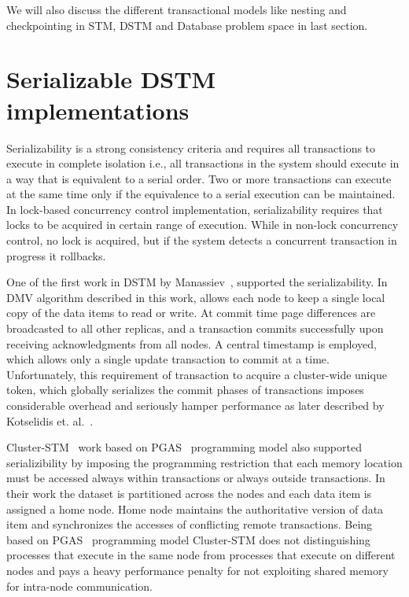 \documentclass[12pt,english]{report}
\begin{document}
We will also discuss the different transactional models like nesting and checkpointing in STM, DSTM and Database problem space in last section. 

\section{Serializable DSTM implementations}

Serializability is a strong consistency criteria and requires all transactions to execute in  complete isolation i.e., all transactions in the system should execute in a way that is equivalent to a serial order. Two or more transactions can execute at the same time only if the equivalence to a serial execution can be maintained. In lock-based concurrency control
implementation, serializability requires that locks to be acquired in certain range of
execution. While in non-lock concurrency control, no lock is acquired, but if the system detects a concurrent transaction in progress it rollbacks.

One of the first work in DSTM by Manassiev~\cite{Manassiev:2006:EDV:1122971.1123002}, supported the serializability. In DMV algorithm described in this work, allows each node to keep a single local copy of the data items to read or write. At commit time page differences are broadcasted to all other replicas, and a transaction commits successfully upon receiving acknowledgments from all nodes. A central timestamp is employed, which allows only a single update transaction to commit at a time. Unfortunately, this requirement of transaction to acquire a cluster-wide unique token, which globally serializes the commit phases of transactions imposes considerable overhead and seriously hamper performance as later described by Kotselidis et. al.~\cite{Kotselidis08distm:a}.

Cluster-STM~\cite{Bocchino:2008:STM:1345206.1345242} work based on PGAS~\cite{PGAS:Programmin:Model} programming model also supported serializibility by imposing the programming restriction that each memory location must be accessed always within transactions or always outside transactions. In their work the dataset is partitioned across the nodes and each data item is assigned a home node. Home node maintains the authoritative version of data item and synchronizes the accesses of conflicting remote transactions. Being
based on PGAS~\cite{PGAS:Programmin:Model} programming model Cluster-STM does not distinguishing processes that execute in the same node from processes
that execute on different nodes and pays a heavy performance penalty for not exploiting shared memory for intra-node communication.
\end{document}
